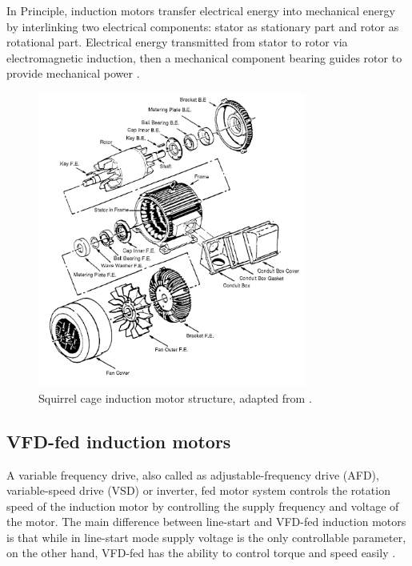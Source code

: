 In Principle, induction motors transfer electrical energy into mechanical energy by interlinking two electrical components: stator as stationary part and rotor as rotational part. Electrical energy transmitted from stator to rotor via electromagnetic induction, then a mechanical component bearing guides rotor to provide mechanical power \cite{oliver1992electric,karmakar2016induction}.

\begin{figure}[h]
	\centering
	\includegraphics[width=250pt,keepaspectratio=true]{./fig/motor.PNG}
	\caption{Squirrel cage induction motor structure, adapted from \cite{oliver1992electric}.}	
	\label{motor}
\end{figure}

\subsection{VFD-fed induction motors}

A variable frequency drive, also called as adjustable-frequency drive (AFD), variable-speed drive (VSD) or inverter, fed motor system controls the rotation speed of the induction motor by controlling the supply frequency and voltage of the motor. The main difference between line-start and VFD-fed induction motors is that while in line-start mode supply voltage is the only controllable parameter, on the other hand, VFD-fed has the ability to control torque and speed easily \cite{faiz2017fault}.

